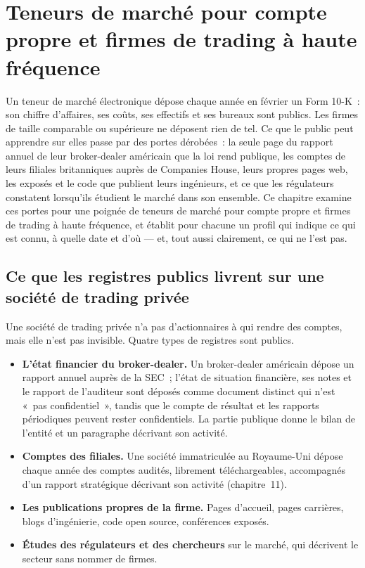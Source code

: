 \chapter{Teneurs de marché pour compte propre et firmes de trading à haute fréquence}\label{ch:in:proprietary-market-makers-and-high-frequency-firms}

Un teneur de marché électronique dépose chaque année en février un Form 10-K~: son chiffre d'affaires, ses coûts, ses effectifs et ses bureaux sont
publics. Les firmes de taille comparable ou supérieure ne déposent rien de tel. Ce que le public peut apprendre sur elles passe par
des portes dérobées~: la seule page du rapport annuel de leur broker-dealer américain que la loi rend publique, les comptes
de leurs filiales britanniques auprès de Companies House, leurs propres pages web, les exposés et le code que publient leurs ingénieurs, et
ce que les régulateurs constatent lorsqu'ils étudient le marché dans son ensemble. Ce chapitre examine ces portes pour une poignée de
teneurs de marché pour compte propre et firmes de trading à haute fréquence, et établit pour chacune un profil qui indique ce qui est connu, à quelle date
et d'où --- et, tout aussi clairement, ce qui ne l'est pas.

\section{Ce que les registres publics livrent sur une société de trading privée}

Une société de trading privée n'a pas d'actionnaires à qui rendre des comptes, mais elle n'est pas invisible. Quatre types de registres sont publics.
\begin{itemize}
\item \textbf{L'état financier du broker-dealer.} Un broker-dealer américain dépose un rapport annuel auprès de la SEC~; l'état de
situation financière, ses notes et le rapport de l'auditeur sont déposés comme document distinct qui n'est «~pas confidentiel~»,
tandis que le compte de résultat et les rapports périodiques peuvent rester confidentiels. La partie publique donne le bilan de l'entité
et un paragraphe décrivant son activité.
\item \textbf{Comptes des filiales.} Une société immatriculée au Royaume-Uni dépose chaque année des comptes audités,
librement téléchargeables, accompagnés d'un rapport stratégique décrivant son activité (chapitre~11).
\item \textbf{Les publications propres de la firme.} Pages d'accueil, pages carrières, blogs d'ingénierie, code open source, conférences
exposés.
\item \textbf{Études des régulateurs et des chercheurs} sur le marché, qui décrivent le secteur sans nommer de firmes.
\end{itemize}

